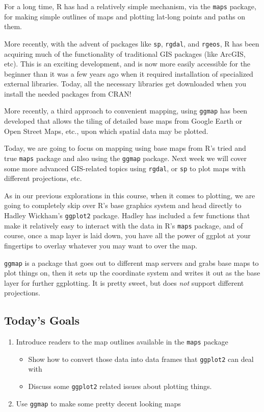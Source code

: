 \documentclass[]{book}
\providecommand{\tightlist}{%
  \setlength{\itemsep}{0pt}\setlength{\parskip}{0pt}}
\theoremstyle{definition}
\theoremstyle{definition}
\theoremstyle{remark}
\begin{document}
For a long time, R has had a relatively simple mechanism, via the
\texttt{maps} package, for making simple outlines of maps and plotting
lat-long points and paths on them.

More recently, with the advent of packages like \texttt{sp},
\texttt{rgdal}, and \texttt{rgeos}, R has been acquiring much of the
functionality of traditional GIS packages (like ArcGIS, etc). This is an
exciting development, and is now more easily accessible for the beginner
than it was a few years ago when it required installation of specialized
external libraries. Today, all the necessary libraries get downloaded
when you install the needed packages from CRAN!

More recently, a third approach to convenient mapping, using
\texttt{ggmap} has been developed that allows the tiling of detailed
base maps from Google Earth or Open Street Maps, etc., upon which
spatial data may be plotted.

Today, we are going to focus on mapping using base maps from R's tried
and true \texttt{maps} package and also using the \texttt{ggmap}
package. Next week we will cover some more advanced GIS-related topics
using \texttt{rgdal}, or \texttt{sp} to plot maps with different
projections, etc.

As in our previous explorations in this course, when it comes to
plotting, we are going to completely skip over R's base graphics system
and head directly to Hadley Wickham's \texttt{ggplot2} package. Hadley
has included a few functions that make it relatively easy to interact
with the data in R's \texttt{maps} package, and of course, once a map
layer is laid down, you have all the power of ggplot at your fingertips
to overlay whatever you may want to over the map.

\texttt{ggmap} is a package that goes out to different map servers and
grabs base maps to plot things on, then it sets up the coordinate system
and writes it out as the base layer for further ggplotting. It is pretty
sweet, but does \emph{not} support different projections.

\subsection{Today's Goals}\label{todays-goals}

\begin{enumerate}
\def\labelenumi{\arabic{enumi}.}
\tightlist
\item
  Introduce readers to the map outlines available in the \texttt{maps}
  package

  \begin{itemize}
  \tightlist
  \item
    Show how to convert those data into data frames that
    \texttt{ggplot2} can deal with
  \item
    Discuss some \texttt{ggplot2} related issues about plotting things.
  \end{itemize}
\item
  Use \texttt{ggmap} to make some pretty decent looking maps
\end{enumerate}
\end{document}
